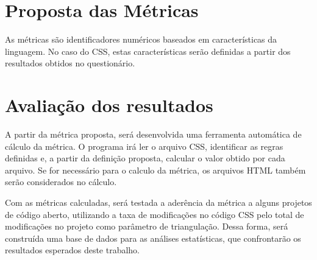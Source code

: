 \section{Proposta das Métricas}

As métricas são identificadores numéricos baseados em características da linguagem. No caso do CSS, estas características serão definidas a partir dos resultados obtidos no questionário.

\section{Avaliação dos resultados}

A partir da métrica proposta, será desenvolvida uma ferramenta automática de cálculo da métrica. O programa irá ler o arquivo CSS, identificar as regras definidas e, a partir da definição proposta, calcular o valor obtido por cada arquivo. Se for necessário para o calculo da métrica, os arquivos HTML também serão considerados no cálculo.

Com as métricas calculadas, será testada a aderência da métrica a alguns projetos de código aberto, utilizando a taxa de modificações no código CSS pelo total de modificações no projeto como parâmetro de triangulação. Dessa forma, será construída uma base de dados para as análises estatísticas, que confrontarão os resultados esperados deste trabalho.
